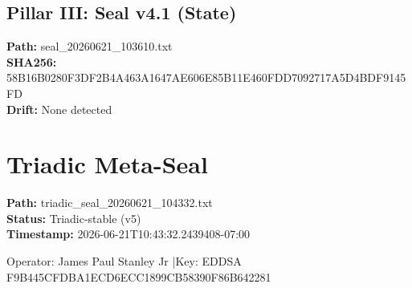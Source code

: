 \documentclass[12pt]{article}
\begin{document}
\vspace{0.35cm}

\subsection*{Pillar III: Seal v4.1 (State)}
\noindent\textbf{Path:} seal\_20260621\_103610.txt\\
\textbf{SHA256:} 58B16B0280F3DF2B4A463A1647AE606E85B11E460FDD7092717A5D4BDF9145FD\\
\textbf{Drift:} None detected

\vspace{0.5cm}

\section*{Triadic Meta-Seal}
\noindent\textbf{Path:} triadic\_seal\_20260621\_104332.txt\\
\textbf{Status:} Triadic-stable (v5)\\
\textbf{Timestamp:} 2026-06-21T10:43:32.2439408-07:00

\vfill

\begin{center}

  \vspace{0.2cm}
  {\small Operator: James Paul Stanley Jr \quad|\quad Key: EDDSA F9B445CFDBA1ECD6ECC1899CB58390F86B642281}
\end{center}
\end{document}
